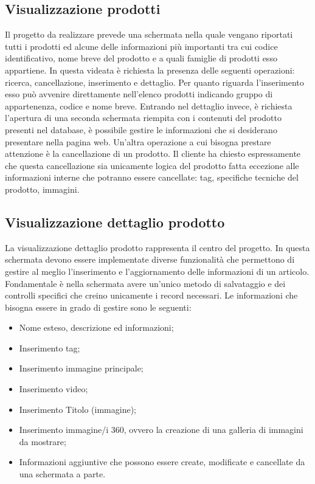 \subsection{Visualizzazione prodotti}
Il progetto da realizzare prevede una schermata nella quale vengano riportati tutti i prodotti ed alcune delle informazioni più importanti tra cui codice identificativo, nome breve del prodotto e a quali famiglie di prodotti esso appartiene. In questa videata è richiesta la presenza delle seguenti operazioni: ricerca, cancellazione, inserimento e dettaglio.
Per quanto riguarda l'inserimento esso può avvenire direttamente nell'elenco prodotti indicando gruppo di appartenenza, codice e nome breve.
Entrando nel dettaglio invece, è richiesta l'apertura di una seconda schermata riempita con i contenuti del prodotto presenti nel database, è possibile gestire le informazioni che si desiderano presentare nella pagina web.
Un'altra operazione a cui bisogna prestare attenzione è la cancellazione di un prodotto. Il cliente ha chiesto espressamente che questa cancellazione sia unicamente logica del prodotto fatta eccezione alle informazioni interne che potranno essere cancellate: tag, specifiche tecniche del prodotto, immagini.

\subsection{Visualizzazione dettaglio prodotto}
La visualizzazione dettaglio prodotto rappresenta il centro del progetto. In questa schermata devono essere implementate diverse funzionalità che permettono di gestire al meglio l'inserimento e l'aggiornamento delle informazioni di un articolo. Fondamentale è nella schermata avere un'unico metodo di salvataggio e dei controlli specifici che creino unicamente i record necessari. 
Le informazioni che bisogna essere in grado di gestire sono le seguenti:
\begin{itemize}
	\item Nome esteso, descrizione ed informazioni;
	\item Inserimento tag;
	\item Inserimento immagine principale;
	\item Inserimento video;
	\item Inserimento Titolo (immagine);
	\item Inserimento immagine/i 360, ovvero la creazione di una galleria di immagini da mostrare;
	\item Informazioni aggiuntive che possono essere create, modificate e cancellate da una schermata a parte.
\end{itemize}

